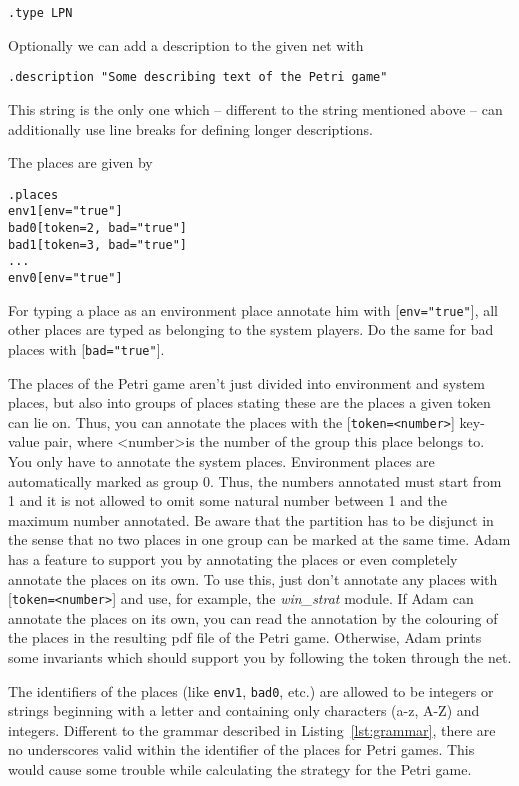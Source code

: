 \documentclass[runningheads]{./llncs/llncs}
\newcommand{\tool}{{\sc Adam}}
\begin{document}
\begin{lstlisting}[language=apt-format]
.type LPN
\end{lstlisting}

Optionally we can add a description to the given net with

\begin{lstlisting}[language=apt-format]
.description "Some describing text of the Petri game"
\end{lstlisting}

This string is the only one which -- different to the string mentioned above -- can additionally use line breaks for defining longer descriptions.

The places are given by

\begin{lstlisting}[language=apt-format]
.places
env1[env="true"]
bad0[token=2, bad="true"]
bad1[token=3, bad="true"]
...
env0[env="true"]
\end{lstlisting}

For typing a place as an environment place annotate him with [\texttt{env="true"}], all other places are typed as belonging to the system players. Do the same for bad places with [\texttt{bad="true"}].

The places of the Petri game aren't just divided into environment and system places, but
also into groups of places stating these are the places a given token can lie on. Thus, 
you can annotate the places with the [\texttt{token=\textless{}number\textgreater}] key-value pair, where \textless{}number\textgreater is the number of the group this place belongs to. You only have to annotate the system 
places. Environment places are automatically marked as group 0. Thus, the numbers
annotated must start from 1 and it is not allowed to omit some natural number between 1
and the maximum number annotated. Be aware that the partition has to be disjunct in the 
sense that no two places in one group can be marked at the same time. \tool{} has a feature 
to support you by annotating the places or even completely annotate the places on its own.
To use this, just don't annotate any places with [\texttt{token=\textless{}number\textgreater{}}] and use, for example, 
the \emph{win\_strat} module. If \tool{} can annotate the places on its own, you can read the
annotation by the colouring of the places in the resulting pdf file of the Petri game.
Otherwise, \tool{} prints some invariants which should support you by following the token 
through the net.

The identifiers of the places (like \texttt{env1}, \texttt{bad0}, etc.) are allowed to be integers or strings beginning with a letter and containing only characters (a-z, A-Z) and integers. Different to the grammar described in Listing~\ref{lst:grammar}, there are no underscores valid within the identifier of the places for Petri games. This would cause some trouble while calculating the strategy for the Petri game.
\end{document}
